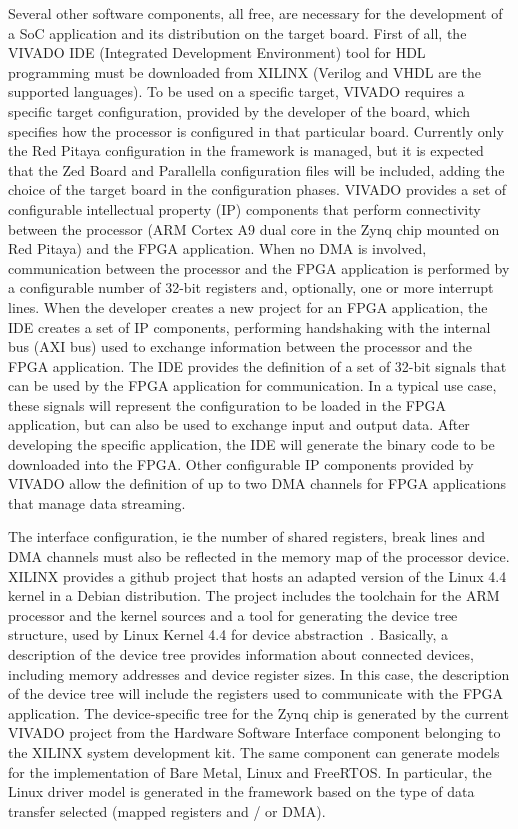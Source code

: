 Several other software components, all free, are necessary for the development of a SoC application and its distribution on the target board. First of all, the VIVADO IDE (Integrated Development Environment) tool for HDL programming must be downloaded from XILINX (Verilog and VHDL are the supported languages). To be used on a specific target, VIVADO requires a specific target configuration, provided by the developer of the board, which specifies how the processor is configured in that particular board. Currently only the Red Pitaya configuration in the framework is managed, but it is expected that the Zed Board and Parallella configuration files will be included, adding the choice of the target board in the configuration phases. VIVADO provides a set of configurable intellectual property (IP) components that perform connectivity between the processor (ARM Cortex A9 dual core in the Zynq chip mounted on Red Pitaya) and the FPGA application. When no DMA is involved, communication between the processor and the FPGA application is performed by a configurable number of 32-bit registers and, optionally, one or more interrupt lines. When the developer creates a new project for an FPGA application, the IDE creates a set of IP components, performing handshaking with the internal bus (AXI bus) used to exchange information between the processor and the FPGA application. The IDE provides the definition of a set of 32-bit signals that can be used by the FPGA application for communication. In a typical use case, these signals will represent the configuration to be loaded in the FPGA application, but can also be used to exchange input and output data. After developing the specific application, the IDE will generate the binary code to be downloaded into the FPGA. Other configurable IP components provided by VIVADO allow the definition of up to two DMA channels for FPGA applications that manage data streaming.

The interface configuration, ie the number of shared registers, break lines and DMA channels must also be reflected in the memory map of the processor device. XILINX provides a github project that hosts an adapted version of the Linux 4.4 kernel in a Debian distribution. The project includes the toolchain for the ARM processor and the kernel sources and a tool for generating the device tree structure, used by Linux Kernel 4.4 for device abstraction~\cite{ana_17}. Basically, a description of the device tree provides information about connected devices, including memory addresses and device register sizes. In this case, the description of the device tree will include the registers used to communicate with the FPGA application. The device-specific tree for the Zynq chip is generated by the current VIVADO project from the Hardware Software Interface component belonging to the XILINX system development kit. The same component can generate models for the implementation of Bare Metal, Linux and FreeRTOS. In particular, the Linux driver model is generated in the framework based on the type of data transfer selected (mapped registers and / or DMA).

